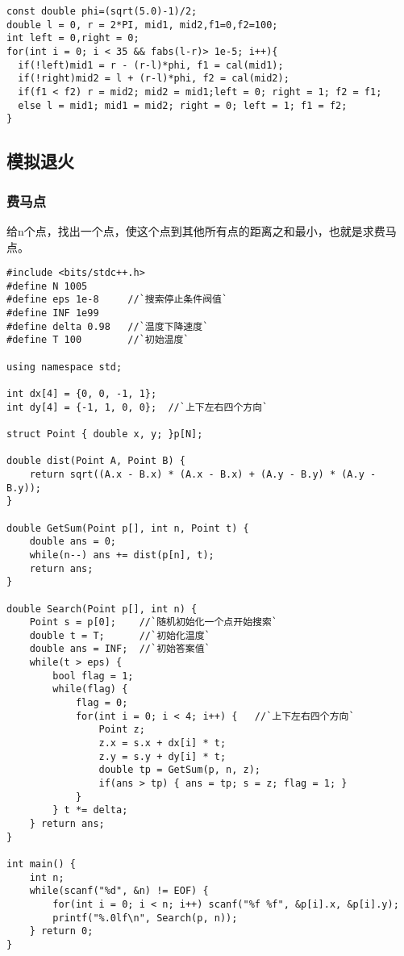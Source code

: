 \begin{lstlisting}
const double phi=(sqrt(5.0)-1)/2;
double l = 0, r = 2*PI, mid1, mid2,f1=0,f2=100;
int left = 0,right = 0;
for(int i = 0; i < 35 && fabs(l-r)> 1e-5; i++){
  if(!left)mid1 = r - (r-l)*phi, f1 = cal(mid1);
  if(!right)mid2 = l + (r-l)*phi, f2 = cal(mid2);
  if(f1 < f2) r = mid2; mid2 = mid1;left = 0; right = 1; f2 = f1;
  else l = mid1; mid1 = mid2; right = 0; left = 1; f1 = f2;
}
\end{lstlisting}

\subsection{模拟退火}

\subsubsection{费马点}
给n个点，找出一个点，使这个点到其他所有点的距离之和最小，也就是求费马点。
\begin{lstlisting}
#include <bits/stdc++.h>
#define N 1005
#define eps 1e-8     //`搜索停止条件阀值`
#define INF 1e99
#define delta 0.98   //`温度下降速度`
#define T 100        //`初始温度`

using namespace std;

int dx[4] = {0, 0, -1, 1};
int dy[4] = {-1, 1, 0, 0};  //`上下左右四个方向`

struct Point { double x, y; }p[N];

double dist(Point A, Point B) {
	return sqrt((A.x - B.x) * (A.x - B.x) + (A.y - B.y) * (A.y - B.y));
}

double GetSum(Point p[], int n, Point t) {
	double ans = 0;
	while(n--) ans += dist(p[n], t);
	return ans;
}

double Search(Point p[], int n) {
	Point s = p[0];    //`随机初始化一个点开始搜索`
	double t = T;      //`初始化温度`
	double ans = INF;  //`初始答案值`
	while(t > eps) {
		bool flag = 1;
		while(flag) {
			flag = 0;
		    for(int i = 0; i < 4; i++) {   //`上下左右四个方向`
			    Point z;
			    z.x = s.x + dx[i] * t;
			    z.y = s.y + dy[i] * t;
			    double tp = GetSum(p, n, z);
		        if(ans > tp) { ans = tp; s = z; flag = 1; }
		    }
		} t *= delta;
	} return ans;
}

int main() {
	int n;
	while(scanf("%d", &n) != EOF) {
		for(int i = 0; i < n; i++) scanf("%f %f", &p[i].x, &p[i].y);
		printf("%.0lf\n", Search(p, n));
	} return 0;
}
\end{lstlisting}


